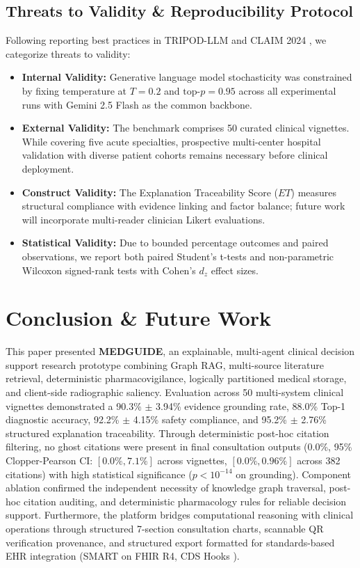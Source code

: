 \documentclass[journal,10pt,twocolumn]{IEEEtran}
\begin{document}
\subsection{Threats to Validity \& Reproducibility Protocol}
Following reporting best practices in TRIPOD-LLM and CLAIM 2024 \cite{claim2024}, we categorize threats to validity:
\begin{itemize}
    \item \textbf{Internal Validity:} Generative language model stochasticity was constrained by fixing temperature at $T=0.2$ and $\text{top-}p=0.95$ across all experimental runs with Gemini 2.5 Flash as the common backbone.
    \item \textbf{External Validity:} The benchmark comprises 50 curated clinical vignettes. While covering five acute specialties, prospective multi-center hospital validation with diverse patient cohorts remains necessary before clinical deployment.
    \item \textbf{Construct Validity:} The Explanation Traceability Score ($ET$) measures structural compliance with evidence linking and factor balance; future work will incorporate multi-reader clinician Likert evaluations.
    \item \textbf{Statistical Validity:} Due to bounded percentage outcomes and paired observations, we report both paired Student's t-tests and non-parametric Wilcoxon signed-rank tests with Cohen's $d_z$ effect sizes.
\end{itemize}

\section{Conclusion \& Future Work}
This paper presented \textbf{MEDGUIDE}, an explainable, multi-agent clinical decision support research prototype combining Graph RAG, multi-source literature retrieval, deterministic pharmacovigilance, logically partitioned medical storage, and client-side radiographic saliency. Evaluation across 50 multi-system clinical vignettes demonstrated a 90.3\% $\pm$ 3.94\% evidence grounding rate, 88.0\% Top-1 diagnostic accuracy, 92.2\% $\pm$ 4.15\% safety compliance, and 95.2\% $\pm$ 2.76\% structured explanation traceability. Through deterministic post-hoc citation filtering, no ghost citations were present in final consultation outputs (0.0\%, 95\% Clopper-Pearson CI: $[0.0\%, 7.1\%]$ across vignettes, $[0.0\%, 0.96\%]$ across 382 citations) with high statistical significance ($p < 10^{-14}$ on grounding). Component ablation confirmed the independent necessity of knowledge graph traversal, post-hoc citation auditing, and deterministic pharmacology rules for reliable decision support. Furthermore, the platform bridges computational reasoning with clinical operations through structured 7-section consultation charts, scannable QR verification provenance, and structured export formatted for standards-based EHR integration (SMART on FHIR R4, CDS Hooks \cite{weed1968medical, mandel2016smart, cdshooks2024}).
\end{document}

